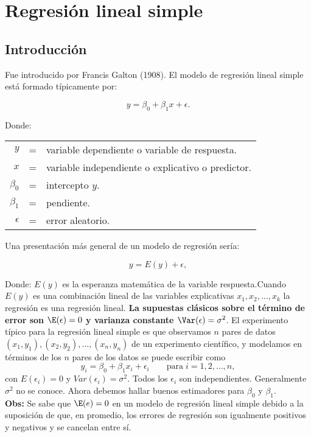 \chapter{Regresión lineal simple}

\section{Introducción}
Fue introducido por Francis Galton (1908). El modelo de regresión lineal simple está formado típicamente por:

$$y=\beta_0+\beta_1x+\epsilon.$$

Donde:\\

\begin{tabular}{rcl}

    $y$ &=& variable dependiente o variable de respuesta.\\
    $x$ &=& variable independiente o explicativo o predictor.\\ 
    $\beta_0$ &=& intercepto  $y$.\\
    $\beta_1$ &=& pendiente.\\ 
    $\epsilon$ &=& error aleatorio.

\end{tabular}

Una presentación más general de un modelo de regresión sería:

$$y=E(y)+\epsilon,$$

Donde: $E(y)$ es la esperanza matemática de la variable respuesta.Cuando $E(y)$ es una combinación lineal  de las variables explicativas $x_1,x_2,\ldots, x_k$ la regresión es una regresión lineal. \textbf{La supuestas clásicos sobre el término de error son \boldmath $\E(\epsilon)=0$ y varianza constante $\Var(\epsilon)=\sigma^2$}. El experimento típico para la regresión lineal simple es que observamos $n$ pares de datos $(x_1, y_1),(x_2, y_2), \ldots ,(x_n, y_n)$ de un experimento científico, y modelamos en términos de los $n$ pares de los datos se puede escribir como
$$y_i=\beta_0+\beta_1x_i+\epsilon_i\qquad \mbox{para}\; i=1,2,\ldots,n,$$
con $E(\epsilon_i)=0$ y $Var(\epsilon_i)=\sigma^2$. Todos los $\epsilon_i$ son independientes. Generalmente $\sigma^2$ no se conoce. 
Ahora debemos hallar buenos estimadores para $\beta_0$ y $\beta_1$.\\

\textbf{Obs:}
Se sabe que $\E(e)=0$ en un modelo de regresión lineal simple debido a la suposición de que, en promedio, los errores de regresión son igualmente positivos y negativos y se cancelan entre sí.


